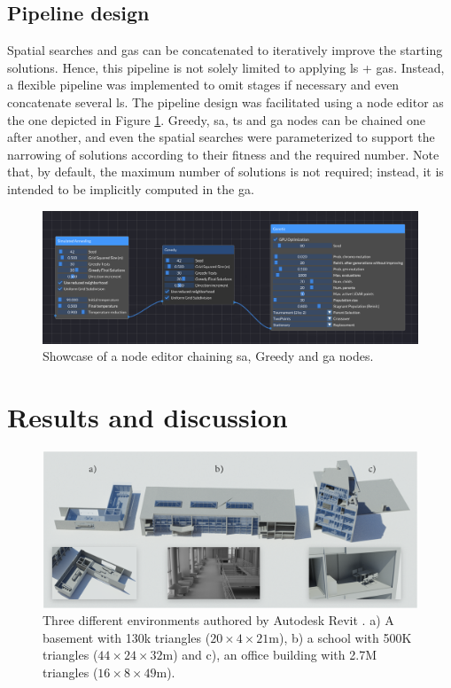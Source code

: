\subsection{Pipeline design}

Spatial searches and \acrshort{ga}s can be concatenated to iteratively improve the starting solutions. Hence, this pipeline is not solely limited to applying \acrshort{ls} + \acrshort{ga}s. Instead, a flexible pipeline was implemented to omit stages if necessary and even concatenate several \acrshort{ls}. The pipeline design was facilitated using a node editor as the one depicted in Figure \ref{fig:optimization_node_editor}. Greedy, \acrshort{sa}, \acrshort{ts} and \acrshort{ga} nodes can be chained one after another, and even the spatial searches were parameterized to support the narrowing of solutions according to their fitness and the required number. Note that, by default, the maximum number of solutions is not required; instead, it is intended to be implicitly computed in the \acrshort{ga}.

\begin{figure}[ht]
    \centering
    \includegraphics[width=\linewidth]{figs/lidar_optimization/optimization_node_editor.png}
	\caption{Showcase of a node editor chaining \acrshort{sa}, Greedy and \acrshort{ga} nodes. }
	\label{fig:optimization_node_editor}
\end{figure}

\section{Results and discussion}

\begin{figure}
    \centering
    \includegraphics[width=.95\linewidth]{figs/lidar_optimization/evaluation_scenes.png}
	\caption{Three different environments authored by Autodesk Revit \textregistered \hspace{.5mm}. a) A basement with 130k triangles ($20 \times 4 \times 21$\si{\meter}), b) a school with 500K triangles ($44 \times 24 \times 32$\si{\meter}) and c), an office building with 2.7M triangles ($16 \times 8 \times 49$\si{\meter}). }
	\label{fig:bim_environments}
\end{figure}

